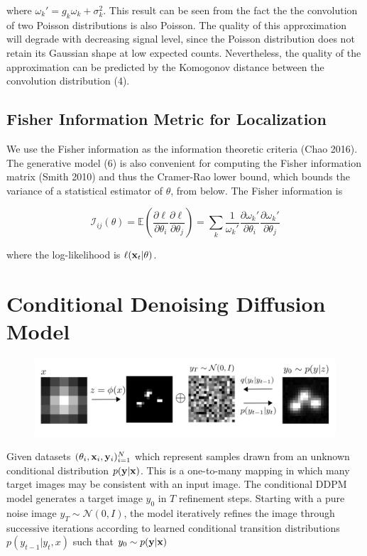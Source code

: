 \documentclass{article}
\begin{document}
where $\omega_{k}' = g_{k}\omega_{k} + \sigma_{k}^{2}$. This result can be seen from the fact the the convolution of two Poisson distributions is also Poisson. The quality of this approximation will degrade with decreasing signal level, since the Poisson distribution does not retain its Gaussian shape at low expected counts. Nevertheless, the quality of the approximation can be predicted by the Komogonov distance between the convolution distribution (4).

\subsection{Fisher Information Metric for Localization}

We use the Fisher information as the information theoretic criteria (Chao 2016). The generative model (6) is also convenient for computing the Fisher information matrix (Smith 2010) and thus the Cramer-Rao lower bound, which bounds the variance of a statistical estimator of $\theta$, from below. The Fisher information is

\begin{equation}
\mathcal{I}_{ij}(\theta) = \mathbb{E}\left(\frac{\partial \ell}{\partial\theta_{i}}\frac{\partial\ell}{\partial\theta_{j}}\right) = \sum_{k}\frac{1}{\omega_{k}'}\frac{\partial \omega_{k}'}{\partial\theta_{i}}\frac{\partial \omega_{k}'}{\partial\theta_{j}}
\end{equation}

where the log-likelihood is $\ell (\bold{x}_{t}|\theta)$.

\section{Conditional Denoising Diffusion Model}


\begin{figure}
\includegraphics[scale=4.0]{Denoise.png}
\end{figure}


Given datasets $(\theta_{i}, \bold{x}_i,\bold{y}_i)_{i=1}^{N}$ which represent samples drawn from an unknown conditional distribution $p(\bold{y}|\bold{x})$. This is a one-to-many mapping in which many target images may be consistent with an input image. The conditional DDPM model generates a target image $y_0$ in $T$ refinement steps. Starting with a pure noise image $y_{T}\sim \mathcal{N}(0,I)$, the model iteratively refines the image through successive iterations according to learned conditional transition distributions $p(y_{t-1}|y_{t},x)$ such that $y_{0} \sim p(\bold{y}|\bold{x})$ 
\end{document}
